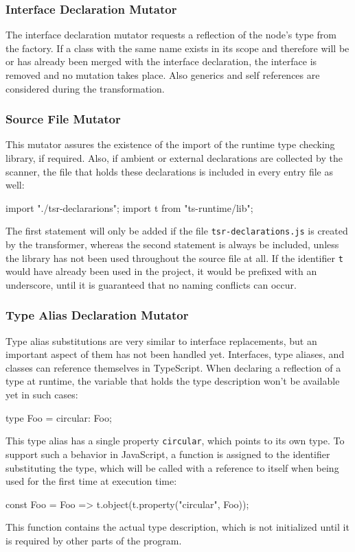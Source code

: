 \subsubsection{Interface Declaration Mutator}

The interface declaration mutator requests a reflection of the node's type from the factory. If a class with the same name exists in its scope and therefore will be or has already been merged with the interface declaration, the interface is removed and no mutation takes place. Also generics and self references are considered during the transformation.

\subsubsection{Source File Mutator}

This mutator assures the existence of the import of the runtime type checking library, if required. Also, if ambient or external declarations are collected by the scanner, the file that holds these declarations is included in every entry file as well:
\begin{JsCode}[numbers=none]
import "./tsr-declararions";
import t from "ts-runtime/lib";  
\end{JsCode}
The first statement will only be added if the file \texttt{tsr-declarations.js} is created by the transformer, whereas the second statement is always be included, unless the library has not been used throughout the source file at all. If the identifier \texttt{t} would have already been used in the project, it would be prefixed with an underscore, until it is guaranteed that no naming conflicts can occur.

\subsubsection{Type Alias Declaration Mutator}

Type alias substitutions are very similar to interface replacements, but an important aspect of them has not been handled yet. Interfaces, type aliases, and classes can reference themselves in TypeScript. When declaring a reflection of a type at runtime, the variable that holds the type description won't be available yet in such cases:
\begin{JsCode}[numbers=none]
type Foo = { circular: Foo; }  
\end{JsCode}
This type alias has a single property \texttt{circular}, which points to its own type. To support such a behavior in JavaScript, a function is assigned to the identifier substituting the type, which will be called with a reference to itself when being used for the first time at execution time:
\begin{JsCode}[numbers=none]
const Foo = Foo => t.object(t.property("circular", Foo));
\end{JsCode}
This function contains the actual type description, which is not initialized until it is required by other parts of the program.

